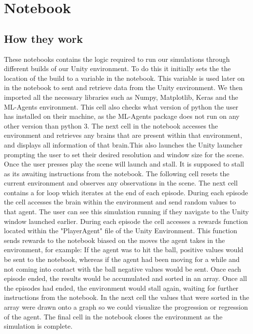 \section{Notebook}
\subsection{How they work}
These notebooks contains the logic required to run our simulations through different builds of our Unity environment. To do this it initially sets the the location of the build to a variable in the notebook. This variable is used later on in the notebook to sent and retrieve data from the Unity environment. We then imported all the necessary libraries such as Numpy, Matplotlib, Keras and the ML-Agents environment. This cell also checks what version of python the user has installed on their machine, as the ML-Agents package does not run on any other version than python 3. The next cell in the notebook accesses the environment and retrieves any brains that are present within that environment, and displays all information of that brain.This also launches the Unity launcher prompting the user to set their desired resolution and window size for the scene. Once the user presses play the scene will launch and stall. It is supposed to stall as its awaiting instructions from the notebook. The following cell resets the current environment and observes any observations in the scene. The next cell contains a for loop which iterates at the end of each episode. During each episode the cell accesses the brain within the environment and send random values to that agent. The user can see this simulation running if they navigate to the Unity window launched earlier. During each episode the cell accesses a rewards function located within the "PlayerAgent" file of the Unity Environment. This function sends rewards to the notebook biased on the moves the agent takes in the environment, for example: If the agent was to hit the ball, positive values would be sent to the notebook, whereas if the agent had been moving for a while and not coming into contact with the ball negative values would be sent. Once each episode ended, the results would be accumulated and sorted in an array. Once all the episodes had ended, the environment would stall again, waiting for further instructions from the notebook. In the next cell the values that were sorted in the array were drawn onto a graph so we could visualize the progression or regression of the agent. The final cell in the notebook closes the environment as the simulation is complete.

